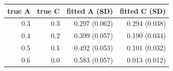 \begin{tabular}{rrrr}
\toprule
true A & true C & fitted A (SD) & fitted C (SD) \\
\midrule
0.3 & 0.3 & 0.297 (0.062) & 0.294 (0.038) \\
0.4 & 0.2 & 0.399 (0.057) & 0.190 (0.034) \\
0.5 & 0.1 & 0.492 (0.053) & 0.101 (0.032) \\
0.6 & 0.0 & 0.583 (0.057) & 0.013 (0.012) \\
\bottomrule
\end{tabular}
